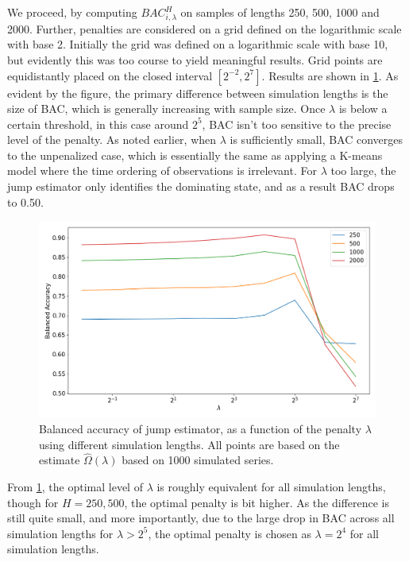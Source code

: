 We proceed, by computing $BAC_{i, \lambda}^H$ on samples of lengths 250, 500, 1000 and 2000. Further, penalties are considered on a grid defined on the logarithmic scale with base 2. Initially the grid was defined on a logarithmic scale with base 10, but evidently this was too course to yield meaningful results. Grid points are equidistantly placed on the closed interval $[2^{-2}, 2^{7}]$. Results are shown in \cref{fig:jump_penalties}. As evident by the figure, the primary difference between simulation lengths is the size of BAC, which is generally increasing with sample size. Once $\lambda$ is below a certain threshold, in this case around $2^5$, BAC isn't too sensitive to the precise level of the penalty. As noted earlier, when $\lambda$ is sufficiently small, BAC converges to the unpenalized case, which is essentially the same as applying a K-means model where the time ordering of observations is irrelevant. For $\lambda$ too large, the jump estimator only identifies the dominating state, and as a result BAC drops to 0.50. 

\begin{figure}[H]
    \centering
    \includegraphics[width=1\textwidth]{analysis/model_convergence/images/jump_penalties.png}
    \caption{Balanced accuracy of jump estimator, as a function of the penalty $\lambda$ using different simulation lengths. All points are based on the estimate $\hat\Omega(\lambda)$ based on 1000 simulated series.}
    \label{fig:jump_penalties}
\end{figure}

From \cref{fig:jump_penalties}, the optimal level of $\lambda$ is roughly equivalent for all simulation lengths, though for $H=250,500$, the optimal penalty is bit higher. As the difference is still quite small, and more importantly, due to the large drop in BAC across all simulation lengths for $\lambda > 2^5$, the optimal penalty is chosen as $\lambda=2^4$ for all simulation lengths. 

